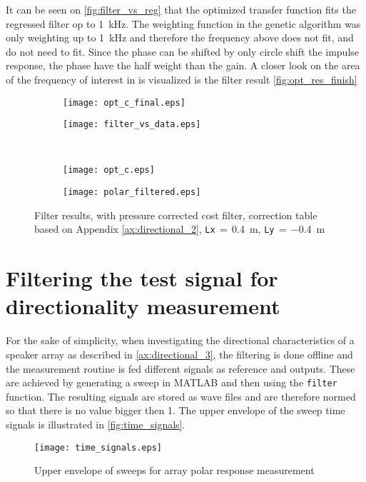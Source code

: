 It can be seen on \autoref{fig:filter_vs_reg} that the optimized transfer function fits the regressed filter op to \SI{1}{\kilo\hertz}. The weighting function in the genetic algorithm was only weighting up to \SI{1}{\kilo\hertz} and therefore the frequency above does not fit, and do not need to fit. Since the phase can be shifted by only circle shift the impulse response, the phase have the half weight than the gain.  A closer look on the area of the frequency of interest in is visualized is the filter result \autoref{fig:opt_res_finish}


\begin{figure}[H]
\begin{subfigure}[c]{0.5\textwidth}
\texttt{[image: opt\_c\_final.eps]}
\label{fig:opt_res_a_finish}
\end{subfigure}
\begin{subfigure}[c]{0.5\textwidth}
\texttt{[image: filter\_vs\_data.eps]}
\label{fig:filter_vs_data_finish}
\end{subfigure}\\
\hspace{0.1\textheight}
\begin{subfigure}[c]{0.5\textwidth}
\texttt{[image: opt\_c.eps]}
\label{fig:opt_res_c_finish}
\end{subfigure}
\begin{subfigure}[c]{0.5\textwidth}
\texttt{[image: polar\_filtered.eps]}
\label{fig:polar_filtered_finish}
\end{subfigure}
\caption{Filter results, with pressure corrected cost filter, correction table based on Appendix \ref{ax:directional_2}, \textcolor{green3}{\texttt{Lx}}\,$=$\,\SI{0.4}{\meter}, \textcolor{green3}{\texttt{Ly}}\,$=\,$\SI{-0.4}{\meter}}
		\label{fig:opt_res_finish}
\end{figure}

\section{Filtering the test signal for directionality measurement}\label{sec:signal_filtering}
For the sake of simplicity, when investigating the directional characteristics of a speaker array as described in \autoref{ax:directional_3}, the filtering is done offline and the measurement routine is fed different signals as reference and outputs. These are achieved by generating a sweep in MATLAB and then using the \texttt{filter} function. The resulting signals are stored as wave files and are therefore normed so that there is no value bigger then 1.
The upper envelope of the sweep time signals is illustrated in \autoref{fig:time_signals}.
\begin{figure}[H]
	\centering
	\texttt{[image: time\_signals.eps]}
	\caption{Upper envelope of sweeps for array polar response measurement}
		\label{fig:time_signal}
\end{figure}


